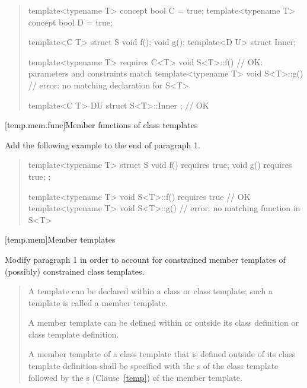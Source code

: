 \begin{quote}
\begin{addedblock}
\enterexample
\begin{codeblock}
template<typename T> concept bool C = true;
template<typename T> concept bool D = true;

template<C T> struct S {
    void f();
    void g();
    template<D U> struct Inner;
  }

template<typename T> requires C<T> void S<T>::f() { } // OK: parameters and constraints match
template<typename T> void S<T>::g() { } // error: no matching declaration for S<T>

template<C T> D{U} struct S<T>::Inner { }; // OK
\end{codeblock}
\exitexample
\end{addedblock}
\end{quote}

[temp.mem.func]{Member functions of class templates}

Add the following example to the end of paragraph 1.

\begin{quote}
\begin{addedblock}
\enterexample
\begin{codeblock}
template<typename T> struct S {
  void f() requires true;
  void g() requires true;
};

template<typename T> 
  void S<T>::f() requires true { } // OK
template<typename T> 
  void S<T>::g() { }               // error: no matching function in S<T>
\end{codeblock}
\exitexample
\end{addedblock}
\end{quote}


[temp.mem]{Member templates}


Modify paragraph 1 in order to account for constrained member templates
of (possibly) constrained class templates. 

\begin{quote}
A template can be declared within a class or class template; such a 
template is called a member template. 

A member template can be defined within or outside its class definition 
or class template definition. 

A member template of a class template that is defined outside of its 
class template definition shall be specified with the 
s 
of the class template followed by the s
 (Clause~\ref{temp}) of the member template.
\end{quote}


